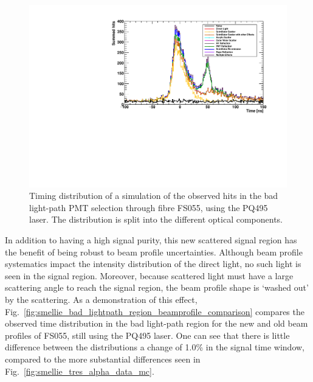 \begin{figure}
    \centering
    \includegraphics[width=\textwidth]{5_SMELLIEAnalysis/images/bad_lightpaths_components_plot_FS055_PQ495_Jul2022.pdf}
    \caption[Timing distribution of a simulation of the observed hits in the bad light-path PMT selection, split by optical components]
    {Timing distribution of a simulation of the observed hits in the bad light-path PMT selection through fibre FS055, using the PQ495 laser. The distribution is split into the different optical components.}
    \label{fig:smellie_bad_lightpath_region_tracked}
\end{figure}

In addition to having a high signal purity, this new scattered signal region has the benefit of being robust to beam profile uncertainties. Although beam profile systematics impact the intensity distribution of the direct light, no such light is seen in the signal region. Moreover, because scattered light must have a large scattering angle to reach the signal region, the beam profile shape is `washed out' by the scattering. As a demonstration of this effect, Fig.~\ref{fig:smellie_bad_lightpath_region_beamprofile_comparison} compares the observed time distribution in the bad light-path region for the new and old beam profiles of FS055, still using the PQ495 laser. One can see that there is little difference between the distributions a change of 1.0\% in the signal time window, compared to the more substantial differences seen in Fig.~\ref{fig:smellie_tres_alpha_data_mc}.

